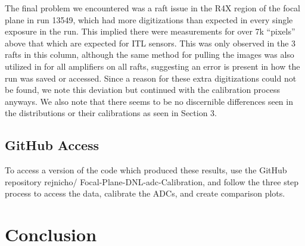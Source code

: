 \documentclass[11pt, letterpaper]{article}
\begin{document}
The final problem we encountered was a raft issue in the R4X region of the focal plane in run 13549, which had more digitizations than expected in every single exposure in the run. 
This implied there were measurements for over 7k “pixels” above that which are expected for ITL sensors. 
This was only observed in the 3 rafts in this column, although the same method for pulling the images was also utilized in for all amplifiers on all rafts, suggesting an error is present in how the run was saved or accessed. 
Since a reason for these extra digitizations could not be found, we note this deviation but continued with the calibration process anyways. 
We also note that there seems to be no discernible differences seen in the distributions or their calibrations as seen in Section 3. 

\subsection{GitHub Access}
\indent 


To access a version of the code which produced these results, use the GitHub repository rejnicho/
Focal-Plane-DNL-adc-Calibration, and follow the three step process to access the data, calibrate the ADCs, and create comparison plots. 

\section{Conclusion}
\indent
\end{document}
